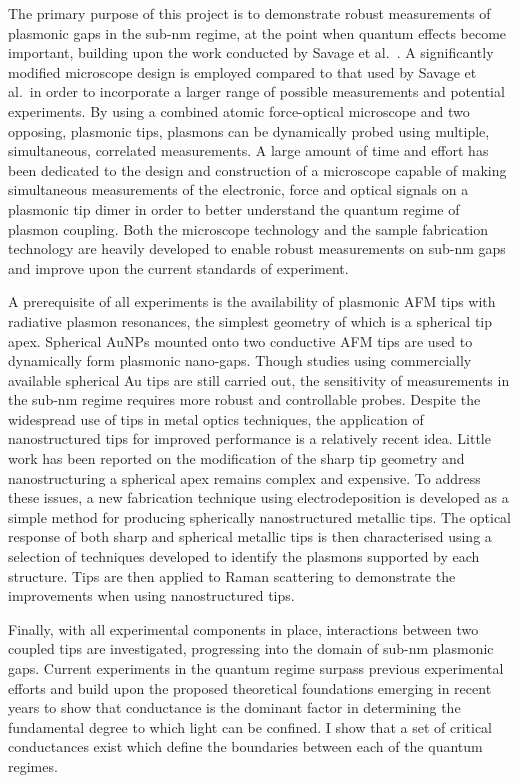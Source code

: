 \documentclass[12pt, a4paper, twoside]{book}
\begin{document}
The primary purpose of this project is to demonstrate robust measurements of plasmonic gaps in the sub-nm regime, at the point when quantum effects become important, building upon the work conducted by Savage et al.\ \cite{savage2012}. A significantly modified microscope design is employed compared to that used by Savage et al.\ in order to incorporate a larger range of possible measurements and potential experiments. By using a combined atomic force-optical microscope and two opposing, plasmonic tips, plasmons can be dynamically probed using multiple, simultaneous, correlated measurements. A large amount of time and effort has been dedicated to the design and construction of a microscope capable of making simultaneous measurements of the electronic, force and optical signals on a plasmonic tip dimer in order to better understand the quantum regime of plasmon coupling. Both the microscope technology and the sample fabrication technology are heavily developed to enable robust measurements on sub-nm gaps and improve upon the current standards of experiment.

A prerequisite of all experiments is the availability of plasmonic AFM tips with radiative plasmon resonances, the simplest geometry of which is a spherical tip apex. Spherical AuNPs mounted onto two conductive AFM tips are used to dynamically form plasmonic nano-gaps. Though studies using commercially available spherical Au tips are still carried out, the sensitivity of measurements in the sub-nm regime requires more robust and controllable probes. Despite the widespread use of tips in metal optics techniques, the application of nanostructured tips for improved performance is a relatively recent idea. Little work has been reported on the modification of the sharp tip geometry and nanostructuring a spherical apex remains complex and expensive. To address these issues, a new fabrication technique using electrodeposition is developed as a simple method for producing spherically nanostructured metallic tips. The optical response of both sharp and spherical metallic tips is then characterised using a selection of techniques developed to identify the plasmons supported by each structure. Tips are then applied to Raman scattering to demonstrate the improvements when using nanostructured tips.

Finally, with all experimental components in place, interactions between two coupled tips are investigated, progressing into the domain of sub-nm plasmonic gaps. Current experiments in the quantum regime surpass previous experimental efforts and build upon the proposed theoretical foundations emerging in recent years to show that conductance is the dominant factor in determining the fundamental degree to which light can be confined. I show that a set of critical conductances exist which define the boundaries between each of the quantum regimes.
\end{document}
